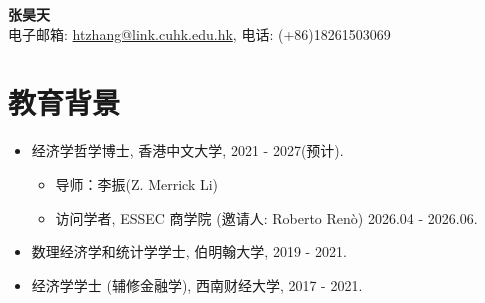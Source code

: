 \documentclass[11pt,a4paper]{article}
\begin{document}
\begin{center}
    {\LARGE \textbf{张昊天}} \\ \vspace{5pt}
    电子邮箱: \url{htzhang@link.cuhk.edu.hk}, \quad 电话: (+86)18261503069
\end{center}

\vspace{10pt}

\section{教育背景}

\begin{itemize}[leftmargin=1.4em, itemsep=0.9em, topsep=0.2em]
    \item 经济学哲学博士, 香港中文大学, \hfill 2021 - 2027(预计).
    \begin{itemize}[label=$\circ$, leftmargin=2.2em, itemsep=0.6em, topsep=0.3em]
        \item 导师：李振(Z. Merrick Li)
        \item 访问学者, ESSEC 商学院 (邀请人: Roberto Ren\`o) \hfill 2026.04 - 2026.06.
    \end{itemize}
    \item 数理经济学和统计学学士, 伯明翰大学, \hfill 2019 - 2021.
    \item 经济学学士 (辅修金融学), 西南财经大学, \hfill 2017 - 2021.
\end{itemize}
\end{document}
